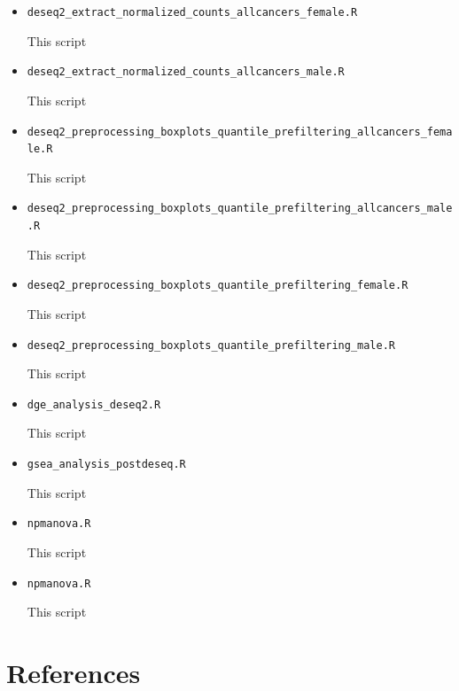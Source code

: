 \documentclass[10pt]{article}
\begin{document}
\begin{itemize}
	\item\texttt{deseq2\_extract\_normalized\_counts\_allcancers\_female.R}
	
	This script 
	
	\item\texttt{deseq2\_extract\_normalized\_counts\_allcancers\_male.R}
	
	This script 
	
	\item\texttt{deseq2\_preprocessing\_boxplots\_quantile\_prefiltering\_allcancers\_female.R}
	
	This script 
	
	\item\texttt{deseq2\_preprocessing\_boxplots\_quantile\_prefiltering\_allcancers\_male.R}
	
	This script 
	
	\item\texttt{deseq2\_preprocessing\_boxplots\_quantile\_prefiltering\_female.R}
	
	This script 
	
	\item\texttt{deseq2\_preprocessing\_boxplots\_quantile\_prefiltering\_male.R}
	
	This script 
	
	\item\texttt{dge\_analysis\_deseq2.R}
	
	This script 
	
	\item\texttt{gsea\_analysis\_postdeseq.R}
	
	This script
	
	\item\texttt{npmanova.R}
	
	This script
	
	\item\texttt{npmanova.R}
	
	This script
	
\end{itemize}

\clearpage\newpage
\section{References}


\nocite{*}
\printbibliography[heading=none, sorting=nyt]
\newpage

%
\end{document}

